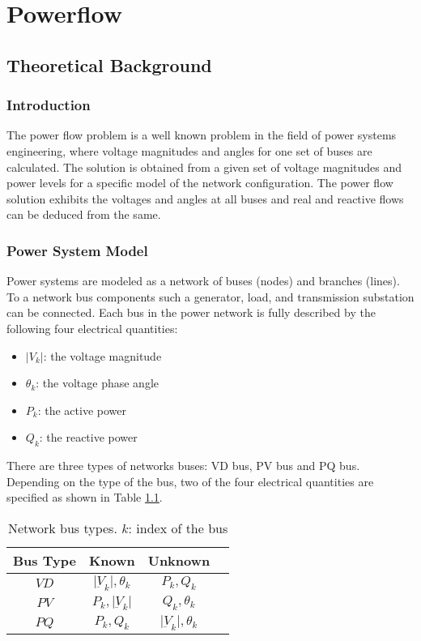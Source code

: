 \chapter{Powerflow}

\section{Theoretical Background}

\subsection{Introduction}
The power flow problem is a well known problem in the field of power systems engineering, where voltage magnitudes and angles for one set of buses are calculated. The solution is obtained from a given set of voltage magnitudes and power levels for a specific model of the network configuration. The power flow solution exhibits the voltages and angles at all buses and real and reactive flows can be deduced from the same. 

\subsection{Power System Model}
Power systems are modeled as a network of buses (nodes) and branches (lines). To a network bus components such a generator, load, and transmission substation can be connected. Each bus in the power network is fully described by the following four electrical quantities:
\begin{itemize}
	\item $\vert V_{k} \vert$: the voltage magnitude 
	\item $\theta_{k}$: the voltage phase angle
	\item $P_{k}$: the active power
	\item $Q_{k}$: the reactive power  
\end{itemize}
There are three types of networks buses: VD bus, PV bus and PQ bus. Depending on the type of the bus, two of the four electrical quantities are specified as shown in Table \ref{Tab:Network_bus_type}.

\begin{table}[]
\centering
\begin{tabular}{cccc} 
\hline
 \textbf{Bus Type}         	&\textbf{ Known }                                        	& \textbf{Unknown}                 \\ \hline
 $VD$              		& $\vert \underbar{V}_{k} \vert, \theta_{k}$   				& $P_{k}, Q_{k}$            \\
 $PV$               		&  $P_{k}, \vert \underbar{V}_{k} \vert$          			& $Q_{k}, \theta_{k}$    \\
 $PQ$              			& $P_{k}, Q_{k}$                             				& $\vert \underbar{V}_{k} \vert, \theta_{k}$ \\
\hline
\end{tabular}
\caption{Network bus types. $k$: index of the bus}
\label{Tab:Network_bus_type}
\end{table}


